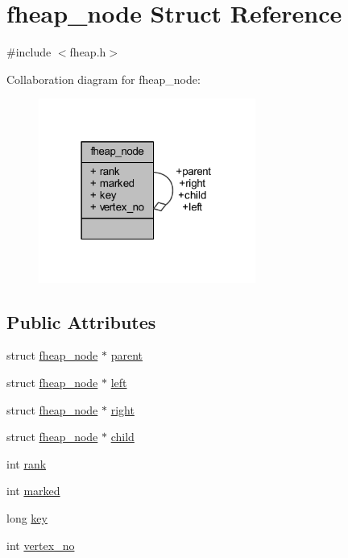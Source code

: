 \hypertarget{structfheap__node}{}\section{fheap\+\_\+node Struct Reference}
\label{structfheap__node}


{\ttfamily \#include $<$fheap.\+h$>$}



Collaboration diagram for fheap\+\_\+node\+:\nopagebreak
\begin{figure}[H]
\begin{center}
\leavevmode
\includegraphics[width=202pt]{structfheap__node__coll__graph}
\end{center}
\end{figure}
\subsection*{Public Attributes}
\begin{DoxyCompactItemize}
\item 
struct \mbox{\hyperlink{structfheap__node}{fheap\+\_\+node}} $\ast$ \mbox{\hyperlink{structfheap__node_a3dc01ed7a15e3eeb6971acf9c1d63e2f}{parent}}
\item 
struct \mbox{\hyperlink{structfheap__node}{fheap\+\_\+node}} $\ast$ \mbox{\hyperlink{structfheap__node_a714c50b04c29981fa46b7c937b328708}{left}}
\item 
struct \mbox{\hyperlink{structfheap__node}{fheap\+\_\+node}} $\ast$ \mbox{\hyperlink{structfheap__node_af83e42765eddab9c0288352be54fe907}{right}}
\item 
struct \mbox{\hyperlink{structfheap__node}{fheap\+\_\+node}} $\ast$ \mbox{\hyperlink{structfheap__node_a5c0411a8c1b8e4712852691605484f80}{child}}
\item 
int \mbox{\hyperlink{structfheap__node_a6e8d65cbe58c9646f5bc2a308f147343}{rank}}
\item 
int \mbox{\hyperlink{structfheap__node_a157ede2cfd1f97c4b71e6eaf91537b56}{marked}}
\item 
long \mbox{\hyperlink{structfheap__node_ae5b8eaa56de8c3e43b958bcc9c46a8e3}{key}}
\item 
int \mbox{\hyperlink{structfheap__node_a830c8feb141fe01db7e4cfab6396ae0d}{vertex\+\_\+no}}
\end{DoxyCompactItemize}


